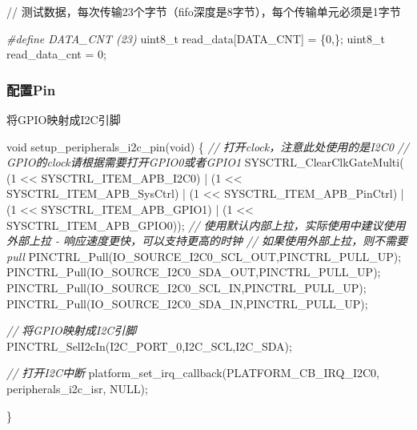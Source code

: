 \documentclass[
  12pt,
]{book}
\newenvironment{Shaded}{\begin{snugshade}}{\end{snugshade}}
\newcommand{\CommentTok}[1]{\textcolor[rgb]{0.56,0.35,0.01}{\textit{#1}}}
\newcommand{\DataTypeTok}[1]{\textcolor[rgb]{0.13,0.29,0.53}{#1}}
\newcommand{\DecValTok}[1]{\textcolor[rgb]{0.00,0.00,0.81}{#1}}
\newcommand{\NormalTok}[1]{#1}
\newcommand{\PreprocessorTok}[1]{\textcolor[rgb]{0.56,0.35,0.01}{\textit{#1}}}
\begin{document}
// 测试数据，每次传输23个字节（fifo深度是8字节），每个传输单元必须是1字节

\begin{Shaded}
\begin{Highlighting}[]
\PreprocessorTok{#define DATA_CNT (23)}
\DataTypeTok{uint8_t}\NormalTok{ read_data[DATA_CNT] = \{}\DecValTok{0}\NormalTok{,\};}
\DataTypeTok{uint8_t}\NormalTok{ read_data_cnt = }\DecValTok{0}\NormalTok{;}
\end{Highlighting}
\end{Shaded}

\hypertarget{ux914dux7f6epin-4}{%
\subsubsection{配置Pin}\label{ux914dux7f6epin-4}}

将GPIO映射成I2C引脚

\begin{Shaded}
\begin{Highlighting}[]
\DataTypeTok{void}\NormalTok{ setup_peripherals_i2c_pin(}\DataTypeTok{void}\NormalTok{)}
\NormalTok{\{}
  \CommentTok{// 打开clock，注意此处使用的是I2C0}
  \CommentTok{// GPIO的clock请根据需要打开GPIO0或者GPIO1}
\NormalTok{  SYSCTRL_ClearClkGateMulti(    (}\DecValTok{1}\NormalTok{ << SYSCTRL_ITEM_APB_I2C0)}
\NormalTok{                                | (}\DecValTok{1}\NormalTok{ << SYSCTRL_ITEM_APB_SysCtrl)}
\NormalTok{                                | (}\DecValTok{1}\NormalTok{ << SYSCTRL_ITEM_APB_PinCtrl)}
\NormalTok{                                | (}\DecValTok{1}\NormalTok{ << SYSCTRL_ITEM_APB_GPIO1)}
\NormalTok{                                | (}\DecValTok{1}\NormalTok{ << SYSCTRL_ITEM_APB_GPIO0));}
  \CommentTok{// 使用默认内部上拉，实际使用中建议使用外部上拉 - 响应速度更快，可以支持更高的时钟}
  \CommentTok{// 如果使用外部上拉，则不需要pull}
\NormalTok{  PINCTRL_Pull(IO_SOURCE_I2C0_SCL_OUT,PINCTRL_PULL_UP);}
\NormalTok{  PINCTRL_Pull(IO_SOURCE_I2C0_SDA_OUT,PINCTRL_PULL_UP);}
\NormalTok{  PINCTRL_Pull(IO_SOURCE_I2C0_SCL_IN,PINCTRL_PULL_UP);}
\NormalTok{  PINCTRL_Pull(IO_SOURCE_I2C0_SDA_IN,PINCTRL_PULL_UP);}
  
  \CommentTok{// 将GPIO映射成I2C引脚}
\NormalTok{  PINCTRL_SelI2cIn(I2C_PORT_0,I2C_SCL,I2C_SDA);}
  
  \CommentTok{// 打开I2C中断}
\NormalTok{  platform_set_irq_callback(PLATFORM_CB_IRQ_I2C0, peripherals_i2c_isr, NULL);}
  
\NormalTok{\}}
\end{Highlighting}
\end{Shaded}
\end{document}
